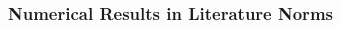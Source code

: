 
\begin{frame}
    \frametitle{Numerical Results in Literature Norms}

    \vspace*{\fill}
    \begin{multicols}{2}

        \begin{center}
            \begin{minipage}{0.4\textwidth}
                \begin{figure}[!ht]
                    
                \end{figure}
            \end{minipage}
        \end{center}

        \vfill\null
        \columnbreak

        \begin{center}
            \begin{minipage}{0.4\textwidth}
                \begin{figure}[!ht]
                    
                \end{figure}
            \end{minipage}
        \end{center}

    \end{multicols}
    \vspace*{\fill}
    
\end{frame}

